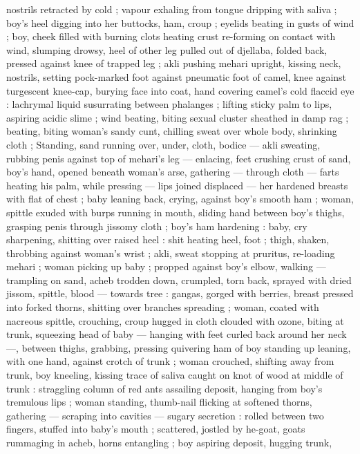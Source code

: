 {nostrils retracted by cold ; vapour exhaling from tongue dripping with 
saliva ; boy's heel digging into her buttocks, ham, croup ; eyelids 
beating in gusts of wind ; boy, cheek filled with burning clots heating 
crust re-forming on contact with wind, slumping drowsy, heel of other 
leg pulled out of djellaba, folded back, pressed against knee of 
trapped leg ; akli pushing mehari upright, kissing neck, nostrils, 
setting pock-marked foot against pneumatic foot of camel, knee 
against turgescent knee-cap, burying face into coat, hand covering 
camel's cold flaccid eye : lachrymal liquid susurrating between 
phalanges ; lifting sticky palm to lips, aspiring acidic slime ; wind 
beating, biting sexual cluster sheathed in damp rag ; beating, biting 
woman's sandy cunt, chilling sweat over whole body, shrinking cloth 
; Standing, sand running over, under, cloth, bodice --- akli sweating, 
rubbing penis against top of mehari's leg --- enlacing, feet crushing 
crust of sand, boy's hand, opened beneath woman's arse, gathering 
--- through cloth --- farts heating his palm, while pressing --- lips 
joined displaced --- her hardened breasts with flat of chest ; baby 
leaning back, crying, against boy's smooth ham ; woman, spittle 
exuded with burps running in mouth, sliding hand between boy's 
thighs, grasping penis through jissomy cloth ; boy's ham hardening 
: baby, cry sharpening, shitting over raised heel : shit heating heel, 
foot ; thigh, shaken, throbbing against woman's wrist ; akli, sweat 
stopping at pruritus, re-loading mehari ; woman picking up baby ; 
propped against boy's elbow, walking --- trampling on sand, acheb 
trodden down, crumpled, torn back, sprayed with dried jissom, 
spittle, blood --- towards tree : gangas, gorged with berries, breast 
pressed into forked thorns, shitting over branches spreading ; 
woman, coated with nacreous spittle, crouching, croup hugged in 
cloth clouded with ozone, biting at trunk, squeezing head of baby --- 
hanging with feet curled back around her neck ---, between thighs, 
grabbing, pressing quivering ham of boy standing up leaning, with 
one hand, against crotch of trunk ; woman crouched, shifting away 
from trunk, boy kneeling, kissing trace of saliva caught on knot of 
wood at middle of trunk : straggling column of red ants assailing 
deposit, hanging from boy's tremulous lips ; woman standing, 
thumb-nail flicking at softened thorns, gathering --- scraping into 
cavities --- sugary secretion : rolled between two fingers, stuffed into 
baby's mouth ; scattered, jostled by he-goat, goats rummaging in 
acheb, horns entangling ; boy aspiring deposit, hugging trunk, 
}
